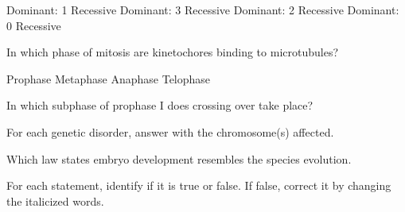 \documentclass[addpoints]{exam}
\begin{document}
\begin{questions}
\begin{choices}
 Dominant: 1 Recessive
 Dominant: 3 Recessive
 Dominant: 2 Recessive
 Dominant: 0 Recessive

\end{choices}

\question[1] In which phase of mitosis are kinetochores binding to microtubules?

\begin{choices}

\choice Prophase
\CorrectChoice Metaphase
\choice Anaphase
\choice Telophase

\end{choices}

\question[3] In which subphase of prophase I does crossing over take place? \fillin[Pachytene][0pt]

\question For each genetic disorder, answer with the chromosome(s) affected.


\question[4] Which law states embryo development resembles the species evolution. 

\question For each statement, identify if it is true or false. If false, correct it by changing the italicized words.

\begin{parts}


\end{parts}
\end{questions}
\end{document}
